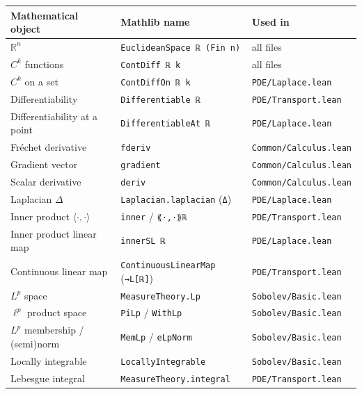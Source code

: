 ﻿\documentclass[12pt, a4paper]{article}
\renewcommand{\_}{\origunderscore\allowbreak}
\theoremstyle{definition}
\theoremstyle{plain}
\begin{document}
\begin{longtable}{@{}L{4.2cm}L{7.0cm}L{3.6cm}@{}}
  \toprule
  \textbf{Mathematical object} & \textbf{Mathlib name} & \textbf{Used in} \\
  \midrule
  \endhead
  $\mathbb{R}^n$ & \texttt{EuclideanSpace ℝ (Fin n)} & all files \\
  $C^k$ functions & \texttt{ContDiff ℝ k} & all files \\
  $C^k$ on a set & \texttt{ContDiffOn ℝ k} & \texttt{PDE/\allowbreak Laplace.\allowbreak lean} \\
  Differentiability & \texttt{Differentiable ℝ} & \texttt{PDE/\allowbreak Transport.\allowbreak lean} \\
  Differentiability at a point & \texttt{DifferentiableAt ℝ} & \texttt{PDE/\allowbreak Laplace.\allowbreak lean} \\
  Fréchet derivative & \texttt{fderiv} & \texttt{Common/\allowbreak Calculus.\allowbreak lean} \\
  Gradient vector & \texttt{gradient} & \texttt{Common/\allowbreak Calculus.\allowbreak lean} \\
  Scalar derivative & \texttt{deriv} & \texttt{Common/\allowbreak Calculus.\allowbreak lean} \\
  Laplacian $\Delta$ & \texttt{Laplacian.laplacian} (\texttt{Δ}) & \texttt{PDE/\allowbreak Laplace.\allowbreak lean} \\
  Inner product $\langle\cdot,\cdot\rangle$ & \texttt{inner} / \texttt{⟪·,·⟫\_ℝ} & \texttt{PDE/\allowbreak Transport.\allowbreak lean} \\
  Inner product linear map & \texttt{innerSL ℝ} & \texttt{PDE/\allowbreak Laplace.\allowbreak lean} \\
  Continuous linear map & \texttt{ContinuousLinearMap} (\texttt{→L[ℝ]}) & \texttt{PDE/\allowbreak Transport.\allowbreak lean} \\
  $L^p$ space & \texttt{MeasureTheory.Lp} & \texttt{Sobolev/\allowbreak Basic.\allowbreak lean} \\
  $\ell^p$ product space & \texttt{PiLp} / \texttt{WithLp} & \texttt{Sobolev/\allowbreak Basic.\allowbreak lean} \\
  $L^p$ membership / (semi)norm & \texttt{MemLp} / \texttt{eLpNorm} & \texttt{Sobolev/\allowbreak Basic.\allowbreak lean} \\
  Locally integrable & \texttt{LocallyIntegrable} & \texttt{Sobolev/\allowbreak Basic.\allowbreak lean} \\
  Lebesgue integral & \texttt{MeasureTheory.integral} & \texttt{PDE/\allowbreak Transport.\allowbreak lean} \\

\end{longtable}
\end{document}
